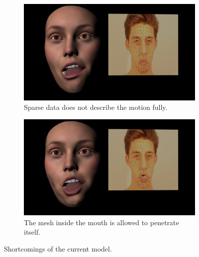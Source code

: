 \begin{figure}
        \centering
        \begin{subfigure}[t]{0.5\textwidth}
                \includegraphics[width=\textwidth]{img/results/Emily_Maya_clean_video_2578}
        \caption{Sparse data does not describe the motion fully.}\label{fig:results3a}
        \end{subfigure}
        \begin{subfigure}[t]{0.5\textwidth}
                \includegraphics[width=\textwidth]{img/results/Emily_Maya_clean_video_2631}
		\caption{The mesh inside the mouth is allowed to penetrate itself.}\label{fig:results3b}        
        \end{subfigure}
        \caption{Shortcomings of the current model.}
        \label{fig:results3}
\end{figure}